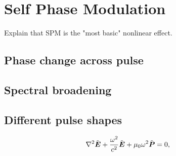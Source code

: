 \chapter{Self Phase Modulation}
\label{ch:SPM}

Explain that SPM is the "most basic" nonlinear effect. 

\section{Phase change across pulse}

\section{Spectral broadening}

\section{Different pulse shapes}


\begin{align}
    \nabla^{2}\tilde{\boldsymbol{E}}+\frac{\omega^{2}}{c^{2}}\tilde{\boldsymbol{E}}+\text{\ensuremath{\mu_{0}}}\omega^{2}\tilde{\boldsymbol{P}}&=0,
\end{align}